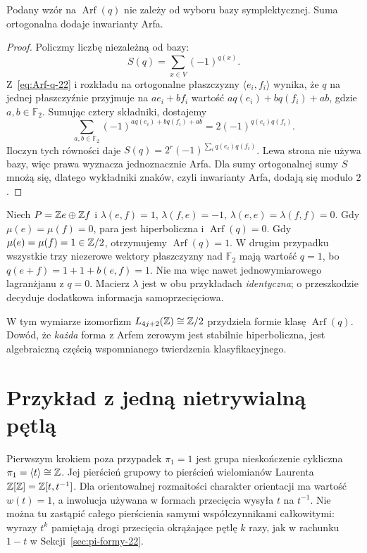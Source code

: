 \begin{stwierdzenie}
\label{prop:Arf-baza-22}
Podany wzór na $\operatorname{Arf}(q)$ nie zależy
od wyboru bazy symplektycznej. Suma ortogonalna
dodaje inwarianty Arfa.
\end{stwierdzenie}
\begin{proof}
Policzmy liczbę niezależną od bazy:
\[
 S(q)=\sum_{x\in V}(-1)^{q(x)}.
\]
Z~\eqref{eq:Arf-q-22} i rozkładu na ortogonalne
płaszczyzny $\langle e_i,f_i\rangle$ wynika,
że $q$ na jednej płaszczyźnie przyjmuje na
$ae_i+bf_i$ wartość
$a q(e_i)+bq(f_i)+ab$, gdzie $a,b\in\mathbb F_2$.
Sumując cztery składniki, dostajemy
\[
 \sum_{a,b\in\mathbb F_2}
  (-1)^{a q(e_i)+bq(f_i)+ab}
     =2(-1)^{q(e_i)q(f_i)}.
\]
Iloczyn tych równości daje
$S(q)=2^r(-1)^{\sum_iq(e_i)q(f_i)}$.
Lewa strona nie używa bazy, więc prawa
wyznacza jednoznacznie Arfa. Dla sumy
ortogonalnej sumy $S$ mnożą się, dlatego
wykładniki znaków, czyli inwarianty Arfa,
dodają się modulo $2$.
\end{proof}

\begin{przyklad}
\label{prz:Arf-dwie-22}
Niech $P=\mathbb{Z} e\oplus\mathbb{Z} f$ i
$\lambda(e,f)=1$, $\lambda(f,e)=-1$,
$\lambda(e,e)=\lambda(f,f)=0$.
Gdy $\mu(e)=\mu(f)=0$, para jest hiperboliczna
i $\operatorname{Arf}(q)=0$. Gdy
$\mu(e)=\mu(f)=1\in\mathbb{Z}/2$, otrzymujemy
$\operatorname{Arf}(q)=1$.
W drugim przypadku wszystkie trzy niezerowe
wektory płaszczyzny nad $\mathbb F_2$ mają
wartość $q=1$, bo
$q(e+f)=1+1+b(e,f)=1$.
Nie ma więc nawet jednowymiarowego
lagranżjanu z $q=0$. Macierz $\lambda$
jest w obu przykładach \emph{identyczna};
o przeszkodzie decyduje dodatkowa informacja
samoprzecięciowa.
\end{przyklad}

W tym wymiarze izomorfizm
$L_{4j+2}(\mathbb{Z})\cong\mathbb{Z}/2$ przydziela formie
klasę $\operatorname{Arf}(q)$. Dowód, że
\emph{każda} forma z Arfem zerowym jest
stabilnie hiperboliczna, jest algebraiczną
częścią wspomnianego twierdzenia klasyfikacyjnego.

\section{Przykład z jedną nietrywialną pętlą}
\label{sec:L-pi1-Z-22}

Pierwszym krokiem poza przypadek $\pi_1=1$
jest grupa nieskończenie cykliczna
$\pi_1=\langle t\rangle\cong\mathbb{Z}$. Jej pierścień
grupowy to pierścień wielomianów Laurenta
$\mathbb{Z}[\mathbb{Z}]=\mathbb{Z}[t,t^{-1}]$. Dla orientowalnej
rozmaitości charakter orientacji ma wartość
$w(t)=1$, a inwolucja używana w formach
przecięcia wysyła $t$ na $t^{-1}$.
Nie można tu zastąpić całego pierścienia
samymi współczynnikami całkowitymi:
wyrazy $t^k$ pamiętają drogi przecięcia
okrążające pętlę $k$ razy, jak w rachunku
$1-t$ w Sekcji~\ref{sec:pi-formy-22}.

